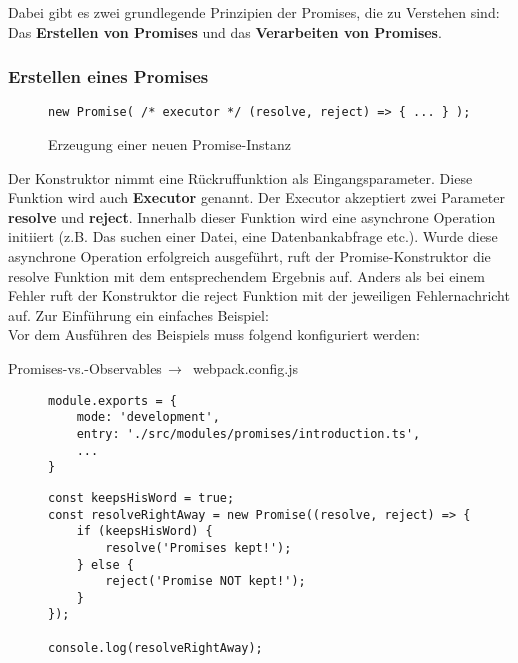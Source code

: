 \noindent
Dabei gibt es zwei grundlegende Prinzipien der Promises, die zu Verstehen sind: Das \textbf{Erstellen von Promises} und das \textbf{Verarbeiten von Promises}.

\subsubsection{Erstellen eines Promises}

\begin{figure}[H]
\begin{lstlisting}
new Promise( /* executor */ (resolve, reject) => { ... } );
\end{lstlisting}
\caption{Erzeugung einer neuen Promise-Instanz}
\end{figure}

Der Konstruktor nimmt eine Rückruffunktion als Eingangsparameter. Diese Funktion wird auch \textbf{Executor} genannt.\cite{promise-executor} Der Executor akzeptiert zwei Parameter \textbf{resolve} und \textbf{reject}. Innerhalb dieser Funktion wird eine asynchrone Operation initiiert (z.B. Das suchen einer Datei, eine Datenbankabfrage etc.). Wurde diese asynchrone Operation erfolgreich ausgeführt, ruft der Promise-Konstruktor die resolve Funktion mit dem entsprechendem Ergebnis auf. Anders als bei einem Fehler ruft der Konstruktor die reject Funktion mit der jeweiligen Fehlernachricht auf. Zur Einführung ein einfaches Beispiel:\\

\noindent
Vor dem Ausführen des Beispiels muss folgend konfiguriert werden:

 \begin{center}
     Promises-vs.-Observables$\,\to\,$ webpack.config.js
 \end{center}

\begin{figure}[H]
\begin{lstlisting}
module.exports = {
    mode: 'development',
    entry: './src/modules/promises/introduction.ts',
    ...
}
\end{lstlisting}
\end{figure}

\begin{figure}[H]
\begin{lstlisting}
const keepsHisWord = true;
const resolveRightAway = new Promise((resolve, reject) => {
    if (keepsHisWord) {
        resolve('Promises kept!');
    } else {
        reject('Promise NOT kept!');
    }
});

console.log(resolveRightAway);
\end{lstlisting}
\end{figure}

